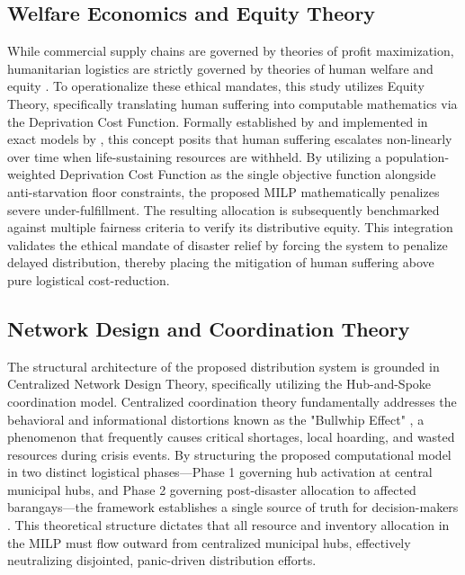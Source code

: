 \subsection{Welfare Economics and Equity Theory}
While commercial supply chains are governed by theories of profit maximization, humanitarian logistics are strictly governed by theories of human welfare and equity \cite{holguin2012unique}. To operationalize these ethical mandates, this study utilizes Equity Theory, specifically translating human suffering into computable mathematics via the Deprivation Cost Function. Formally established by \cite{gutjahr2018} and implemented in exact models by \cite{li2021pre}, this concept posits that human suffering escalates non-linearly over time when life-sustaining resources are withheld. By utilizing a population-weighted Deprivation Cost Function as the single objective function alongside anti-starvation floor constraints, the proposed MILP mathematically penalizes severe under-fulfillment. The resulting allocation is subsequently benchmarked against multiple fairness criteria to verify its distributive equity. This integration validates the ethical mandate of disaster relief by forcing the system to penalize delayed distribution, thereby placing the mitigation of human suffering above pure logistical cost-reduction.

\subsection{Network Design and Coordination Theory}
The structural architecture of the proposed distribution system is grounded in Centralized Network Design Theory, specifically utilizing the Hub-and-Spoke coordination model. Centralized coordination theory fundamentally addresses the behavioral and informational distortions known as the "Bullwhip Effect" \cite{lee1997information}, a phenomenon that frequently causes critical shortages, local hoarding, and wasted resources during crisis events. By structuring the proposed computational model in two distinct logistical phases—Phase 1 governing hub activation at central municipal hubs, and Phase 2 governing post-disaster allocation to affected barangays—the framework establishes a single source of truth for decision-makers \cite{balcik2010}. This theoretical structure dictates that all resource and inventory allocation in the MILP must flow outward from centralized municipal hubs, effectively neutralizing disjointed, panic-driven distribution efforts.

